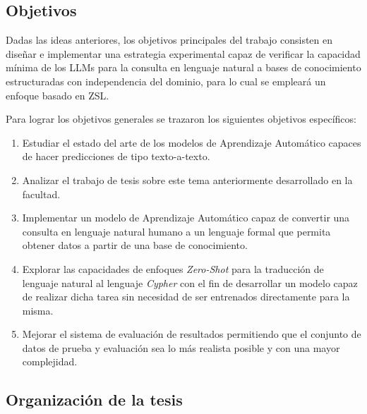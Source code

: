 \subsection*{Objetivos}
Dadas las ideas anteriores, los objetivos principales del trabajo consisten en diseñar e implementar una estrategia experimental capaz de verificar la capacidad mínima de los LLMs para la consulta en lenguaje natural a bases de conocimiento estructuradas con independencia del dominio, para lo cual se empleará un enfoque basado en ZSL.

Para lograr los objetivos generales se trazaron los siguientes objetivos específicos:

\begin{enumerate}
	\item Estudiar el estado del arte de los modelos de Aprendizaje Automático capaces de hacer predicciones de tipo texto-a-texto.
	\item Analizar el trabajo de tesis sobre este tema anteriormente desarrollado en la facultad.
	\item Implementar un modelo de Aprendizaje Automático capaz de convertir una consulta en lenguaje natural humano a un lenguaje formal que permita obtener datos a partir de una 		base de conocimiento.
	\item Explorar las capacidades de enfoques \textit{Zero-Shot} para la traducción de lenguaje natural al lenguaje \textit{Cypher} con el fin de desarrollar un modelo capaz de realizar dicha tarea sin necesidad de ser entrenados directamente para la misma.
	\item Mejorar el sistema de evaluación de resultados permitiendo que el conjunto de datos de prueba y evaluación sea lo más realista posible y con una mayor complejidad.
\end{enumerate}

\subsection*{Organización de la tesis}

